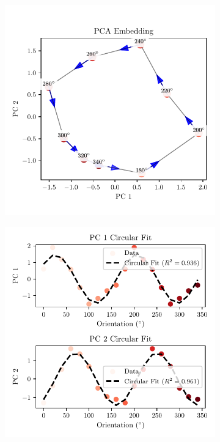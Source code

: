 \documentclass[11pt,a4paper]{article}
\begin{document}
\begin{figure}
    \centering
    \begin{subfigure}[b]{0.48\textwidth}
        \centering
        \includegraphics[width=\textwidth]{results/ann_circular_colormap_visualization.pdf}
        \label{fig:circular_colormap}
    \end{subfigure}
    \hfill
    \begin{subfigure}[b]{0.48\textwidth}
        \centering
        \includegraphics[width=\textwidth]{results/ann_circular_regression.pdf}

\end{subfigure}
\end{figure}
\end{document}
